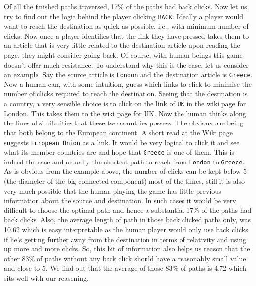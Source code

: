 \documentclass[letterpaper,12pt]{article}
\begin{document}
Of all the finished paths traversed, 17\% of the paths had back clicks. Now let us try to find out the logic behind the player clicking \verb|BACK|. Ideally a player would want to reach the destination as quick as possible, i.e., with minimum number of clicks. Now once a player identifies that the link they have pressed takes them to an article that is very little related to the destination article upon reading the page, they might consider going back. Of course, with human beings this game doesn't offer much resistance. To understand why this is the case, let us consider an example. Say the source article is \verb|London| and the destination article is \verb|Greece|. Now a human can, with some intuition, guess which links to click to minimise the number of clicks required to reach the destination. Seeing that the destination is a country, a very sensible choice is to click on the link of \verb|UK| in the wiki page for London. This takes them to the wiki page for UK. Now the human thinks along the lines of similarities that these two countries possess. The obvious one being that both belong to the European continent. A short read at the Wiki page suggests \verb|European Union| as a link. It would be very logical to click it and see what its member countries are and hope that \verb|Greece| is one of them. This is indeed the case and actually the shortest path to reach from \verb|London| to \verb|Greece|. As is obvious from the example above, the number of clicks can be kept below 5 (the diameter of the big connected component) most of the times, still it is also very much possible that the human playing the game has little previous information about the source and destination. In such cases it would be very difficult to choose the optimal path and hence a substantial 17\% of the paths had back clicks. Also, the average length of path in those back clicked paths only, was 10.62 which is easy interpretable as the human player would only use back clicks if he's getting further away from the destination in terms of relativity and using up more and more clicks. So, this bit of information also helps us reason that the other 83\% of paths without any back click should have a reasonably small value and close to 5. We find out that the average of those 83\% of paths is 4.72 which sits well with our reasoning.

\bigskip
\end{document}
